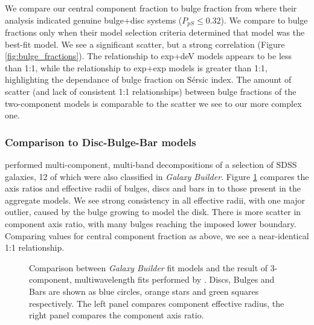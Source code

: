 \documentclass[../main.tex]{subfiles}
\begin{document}
We compare our central component fraction to bulge fraction from \citet{2011ApJS..196...11S} where their analysis indicated genuine bulge+disc systems ($P_{pS} \le 0.32$). We compare to \citet{2012MNRAS.421.2277L} bulge fractions only when their model selection criteria determined that model was the best-fit model. We see a significant scatter, but a strong correlation (Figure \ref{fig:bulge_fractions}). The relationship to exp+deV models appears to be less than 1:1, while the relationship to exp+exp models is greater than 1:1, highlighting the dependance of bulge fraction on S\'ersic index. The amount of scatter (and lack of consistent 1:1 relationships) between bulge fractions of the two-component models is comparable to the scatter we see to our more complex one.


\begin{figure*}
  \caption{Scatter plots comparing the ratio of flux from central components (bulge and bar) to the total flux between fit models from \textit{Galaxy Builder} and two-component models in the literature.}
  \label{fig:bulge_fractions}
\end{figure*}


\subsubsection{Comparison to Disc-Bulge-Bar models}

\citet{2018MNRAS.473.4731K} performed multi-component, multi-band decompositions of a selection of SDSS galaxies, 12 of which were also classified in \textit{Galaxy Builder}. Figure \ref{fig:sd_comp_comparison} compares the axis ratios and effective radii of bulges, discs and bars in \citet{2018MNRAS.473.4731K} to those present in the aggregate models. We see strong consistency in all effective radii, with one major outlier, caused by the bulge growing to model the disk. There is more scatter in component axis ratio, with many bulges reaching the imposed lower boundary. Comparing values for central component fraction as above, we see a near-identical 1:1 relationship.

\begin{figure}
  \caption{Comparison between \textit{Galaxy Builder} fit models and the result of 3-component, multi\-wavelength fits performed by \citet{2018MNRAS.473.4731K}. Discs, Bulges and Bars are shown as blue circles, orange stars and green squares respectively. The left panel compares component effective radius, the right panel compares the component axis ratio.}
  \label{fig:sd_comp_comparison}
\end{figure}
\end{document}
